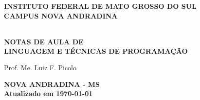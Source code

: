 \thispagestyle{empty}

\vfill
 \begin{center}
    
    {\large\bfseries INSTITUTO FEDERAL DE MATO GROSSO DO SUL} \\
    
    {\large\bfseries CAMPUS NOVA ANDRADINA}  \\ 

    \vspace*{1in}

    \vspace*{4cm}
    \noindent \\
    
    \large\bfseries{NOTAS DE AULA DE} \\
    \huge\bfseries{LINGUAGEM E TÉCNICAS DE PROGRAMAÇÃO}
    
    \vspace*{4cm}
    
    \large{Prof. Me. Luiz F. Picolo}
    
    \vfill
    \large\bfseries{NOVA ANDRADINA - MS} \\ 
    \vspace{0.2cm}
    \small Atualizado em \today
\end{center}

\normalsize



